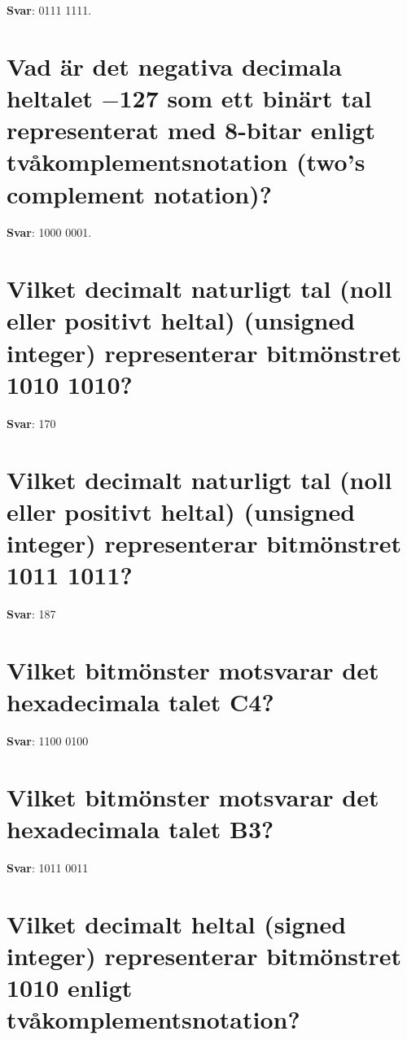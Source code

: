 \documentclass[a4paper,11pt,oneside]{book}
\begin{document}
\begin{sloppypar}
\textbf{Svar}: 0111 1111.



\section{Vad \"ar det negativa decimala heltalet \ensuremath{-}127 som ett bin\"art tal representerat med 8-bitar enligt tv\r{a}komplementsnotation (two{\textquoteright}s complement notation)?}

\label{q:372:sa:sv:True}

\textbf{Svar}: 1000 0001.



\section{Vilket decimalt naturligt tal (noll eller positivt heltal) (unsigned integer) representerar bitm\"onstret 1010 1010?}

\label{q:373:sa:sv:True}

\textbf{Svar}: 170



\section{Vilket decimalt naturligt tal (noll eller positivt heltal) (unsigned integer) representerar bitm\"onstret 1011 1011?}

\label{q:374:sa:sv:True}

\textbf{Svar}: 187



\section{Vilket bitm\"onster motsvarar det hexadecimala talet C4?}

\label{q:375:sa:sv:True}

\textbf{Svar}: 1100 0100



\section{Vilket bitm\"onster motsvarar det hexadecimala talet B3?}

\label{q:376:sa:sv:True}

\textbf{Svar}: 1011 0011



\section{Vilket decimalt heltal (signed integer) representerar bitm\"onstret 1010 enligt tv\r{a}komplementsnotation?}


\end{sloppypar}
\end{document}
